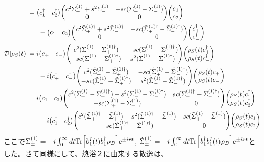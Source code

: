 \documentclass[dvipdfmx,autodetect-engine]{jsarticle}
\newcommand{\da}{\dagger}
\newcommand{\m}[1]{\mathcal{#1}}
\newcommand{\ttr}[1]{\mathrm{Tr}\Bigl[#1\Bigr]}
\begin{document}
\begin{align}
    &= \mqty(c^\da_1 & c^\da_2)\mqty(c^2 \Sigma^{(1)}_+ + s^2 \Sigma^{(1)}_- & -sc(\Sigma^{(1)}_+-\Sigma^{(1)}_- )\\ 0 & 0 )\mqty(c_1 \\ c_2)\nonumber\\
    & \ \ \ \ \  - \mqty(c_1 & c_2)\mqty(c^2 \tilde{\Sigma}^{(1)\da}_++s^2 \tilde{\Sigma}^{(1)\da}_- & -sc( \tilde{\Sigma}^{(1)\da}_+- \tilde{\Sigma}^{(1)\da}_-) \\ 0 & 0)\mqty(c^\da_+ \\ c^\da_-)\\
    \tilde{\m{D}}[\rho_S(t)] &= i\mqty(c_+ & c_-) \mqty(c^2(\Sigma^{(1)}_+-\Sigma^{(1)\da}_+) & -sc(\Sigma^{(1)}_+-\Sigma^{(1)\da}_-) \\ -sc(\Sigma^{(1)}_--\Sigma^{(1)\da}_+) & s^2(\Sigma^{(1)}_--\Sigma^{(1)\da}_-))\mqty(\rho_S(t)c^\da_+ \\ \rho_S(t)c^\da_-)\nonumber\\
     & \ \ \ \ \ - i\mqty(c^\da_+ & c^\da_-) \mqty(c^2(\tilde{\Sigma}^{(1)}_+-\tilde{\Sigma}^{(1)\da}_+) & -sc(\tilde{\Sigma}^{(1)}_+-\tilde{\Sigma}^{(1)\da}_-) \\ -sc(\tilde{\Sigma}^{(1)}_--\tilde{\Sigma}^{(1)\da}_+) & s^2(\tilde{\Sigma}^{(1)}_--\tilde{\Sigma}^{(1)\da}_-))\mqty(\rho_S(t)c_+ \\ \rho_S(t)c_-)\\
     & = i\mqty(c_1 & c_2) \mqty(c^2(\Sigma^{(1)}_+-\Sigma^{(1)\da}_+) +s^2(\Sigma^{(1)}_--\Sigma^{(1)\da}_-) & sc(\Sigma^{(1)\da}_+-\Sigma^{(1)\da}_-) \\ -sc(\Sigma^{(1)}_+-\Sigma^{(1)}_-) & 0)\mqty(\rho_S(t)c^\da_1 \\ \rho_S(t)c^\da_2)\nonumber\\
     & \ \ \ \ \ - i\mqty(c^\da_1 & c^\da_2) \mqty(c^2(\tilde{\Sigma}^{(1)\da}_+-\tilde{\Sigma}^{(1)}_+) +s^2(\tilde{\Sigma}^{(1)\da}_--\tilde{\Sigma}^{(1)}_-) & sc(\tilde{\Sigma}^{(1)}_+-\tilde{\Sigma}^{(1)}_-) \\ -sc(\tilde{\Sigma}^{(1)\da}_+-\tilde{\Sigma}^{(1)\da}_-) & 0)\mqty(\rho_S(t)c_1 \\ \rho_S(t)c_2)
\end{align}
ここで$\Sigma^{(1)}_\pm = -i\int_0^\infty dt\ttr{b^I_1(t)b^\da_1\rho_B}e^{\pm irt}$, $\tilde{\Sigma}^{(1)}_\pm = -i\int_0^\infty dt\ttr{b^\da_1b^I_1(t)\rho_B}e^{\pm irt}$とした。さて同様にして、熱浴２に由来する散逸は、
\end{document}
